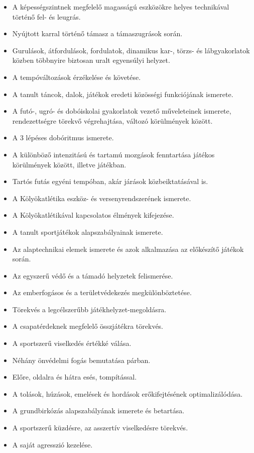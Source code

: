 \begin{itemize}
\item A képességszintnek megfelelő magasságú eszközökre helyes technikával történő fel- és leugrás.
\item Nyújtott karral történő támasz a támaszugrások során.
\item Gurulások, átfordulások, fordulatok, dinamikus kar-, törzs- és lábgyakorlatok közben többnyire biztosan uralt egyensúlyi helyzet.
\item A tempóváltozások érzékelése és követése.
\item A tanult táncok, dalok, játékok eredeti közösségi funkciójának ismerete.
\item A futó-, ugró- és dobóiskolai gyakorlatok vezető műveleteinek ismerete, rendezettségre törekvő végrehajtása, változó körülmények között.
\item A 3 lépéses dobóritmus ismerete.
\item A különböző intenzitású és tartamú mozgások fenntartása játékos körülmények között, illetve játékban.
\item Tartós futás egyéni tempóban, akár járások közbeiktatásával is.
\item A Kölyökatlétika eszköz- és versenyrendszerének ismerete.
\item A Kölyökatlétikával kapcsolatos élmények kifejezése.
\item A tanult sportjátékok alapszabályainak ismerete.
\item Az alaptechnikai elemek ismerete és azok alkalmazása az előkészítő játékok során.
\item Az egyszerű védő és a támadó helyzetek felismerése.
\item Az emberfogásos és a területvédekezés megkülönböztetése.
\item Törekvés a legcélszerűbb játékhelyzet-megoldásra.
\item A csapatérdeknek megfelelő összjátékra törekvés.
\item A sportszerű viselkedés értékké válása.
\item Néhány önvédelmi fogás bemutatása párban.
\item Előre, oldalra és hátra esés, tompítással.
\item A tolások, húzások, emelések és hordások erőkifejtésének optimalizálódása.
\item A grundbirkózás alapszabályának ismerete és betartása.
\item A sportszerű küzdésre, az asszertív viselkedésre törekvés.
\item A saját agresszió kezelése.

\end{itemize}
